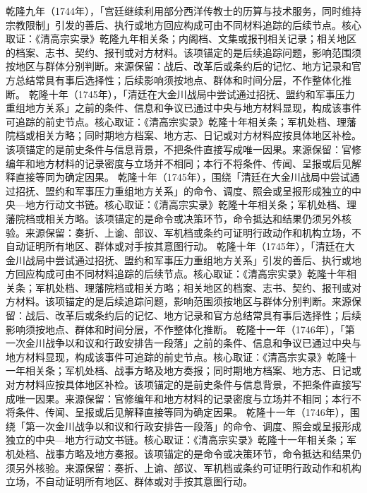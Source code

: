 乾隆九年（1744年），「宫廷继续利用部分西洋传教士的历算与技术服务，同时维持宗教限制」引发的善后、执行或地方回应构成可由不同材料追踪的后续节点。核心取证：《清高宗实录》乾隆九年相关条；内阁档、文集或报刊相关记录；相关地区的档案、志书、契约、报刊或对方材料。该项锚定的是后续追踪问题，影响范围须按地区与群体分别判断。来源保留：战后、改革后或条约后的记忆、地方记录和官方总结常具有事后选择性；后续影响须按地点、群体和时间分层，不作整体化推断。
乾隆十年（1745年），「清廷在大金川战局中尝试通过招抚、盟约和军事压力重组地方关系」之前的条件、信息和争议已通过中央与地方材料显现，构成该事件可追踪的前史节点。核心取证：《清高宗实录》乾隆十年相关条；军机处档、理藩院档或相关方略；同时期地方档案、地方志、日记或对方材料应按具体地区补检。该项锚定的是前史条件与信息背景，不把条件直接写成唯一因果。来源保留：官修编年和地方材料的记录密度与立场并不相同；本行不将条件、传闻、呈报或后见解释直接等同为确定因果。
乾隆十年（1745年），围绕「清廷在大金川战局中尝试通过招抚、盟约和军事压力重组地方关系」的命令、调度、照会或呈报形成独立的中央—地方行动文书链。核心取证：《清高宗实录》乾隆十年相关条；军机处档、理藩院档或相关方略。该项锚定的是命令或决策环节，命令抵达和结果仍须另外核验。来源保留：奏折、上谕、部议、军机档或条约可证明行政动作和机构立场，不自动证明所有地区、群体或对手按其意图行动。
乾隆十年（1745年），「清廷在大金川战局中尝试通过招抚、盟约和军事压力重组地方关系」引发的善后、执行或地方回应构成可由不同材料追踪的后续节点。核心取证：《清高宗实录》乾隆十年相关条；军机处档、理藩院档或相关方略；相关地区的档案、志书、契约、报刊或对方材料。该项锚定的是后续追踪问题，影响范围须按地区与群体分别判断。来源保留：战后、改革后或条约后的记忆、地方记录和官方总结常具有事后选择性；后续影响须按地点、群体和时间分层，不作整体化推断。
乾隆十一年（1746年），「第一次金川战争以和议和行政安排告一段落」之前的条件、信息和争议已通过中央与地方材料显现，构成该事件可追踪的前史节点。核心取证：《清高宗实录》乾隆十一年相关条；军机处档、战事方略及地方奏报；同时期地方档案、地方志、日记或对方材料应按具体地区补检。该项锚定的是前史条件与信息背景，不把条件直接写成唯一因果。来源保留：官修编年和地方材料的记录密度与立场并不相同；本行不将条件、传闻、呈报或后见解释直接等同为确定因果。
乾隆十一年（1746年），围绕「第一次金川战争以和议和行政安排告一段落」的命令、调度、照会或呈报形成独立的中央—地方行动文书链。核心取证：《清高宗实录》乾隆十一年相关条；军机处档、战事方略及地方奏报。该项锚定的是命令或决策环节，命令抵达和结果仍须另外核验。来源保留：奏折、上谕、部议、军机档或条约可证明行政动作和机构立场，不自动证明所有地区、群体或对手按其意图行动。
